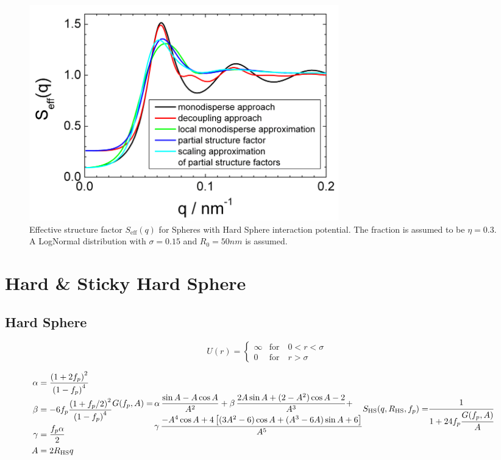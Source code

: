 \begin{figure}[htb]
\begin{center}
\includegraphics[width=0.65\textwidth]{../images/structure_factor/Seff.png}
\end{center}
\caption{Effective structure factor $S_\text{eff}(q)$ for Spheres with Hard Sphere interaction potential.
The fraction is assumed to be $\eta=0.3$. A LogNormal distribution with $\sigma=0.15$ and $R_0=50nm$
is assumed.}
\label{fig:Seff}
\end{figure}

\clearpage
\section{Hard \& Sticky Hard Sphere}
\subsection{Hard Sphere} \cite{Percus1958,Vrij1979}

\begin{equation}
U(r) =
 \begin{cases}
      \infty    & \text{for} \quad 0<r<\sigma \\
      0         & \text{for} \quad r>\sigma
   \end{cases}
\end{equation}

\begin{subequations}
\begin{align}
\alpha &= \frac{\left(1+2f_p\right)^2}{\left(1-f_p\right)^4} \\
\beta  &= -6 f_p \frac{\left(1 +f_p/2 \right)^2}{\left(1-f_p\right)^4} \\
\gamma &= \frac{f_p \alpha}{2}  \\
A &= 2 R_\text{HS} q
\end{align}

\begin{align}
G(f_p,A) =  & \, \alpha \, \frac{\sin A -A \cos A }{A^2} + \beta \, \frac{2 A \sin A +(2-A^2) \cos A -2}{A^3} + \nonumber \\
    & \, \gamma  \, \frac{-A^4 \cos A + 4\left[(3A^2-6)\cos A+(A^3-6A)\sin A+6\right]}{A^5}
\end{align}
\begin{align}
S_\text{HS}(q,R_\text{HS},f_p)  = & \cfrac{1}{1+24 f_p
\cfrac{G(f_p,A)}{A}}
\end{align}
\end{subequations}



